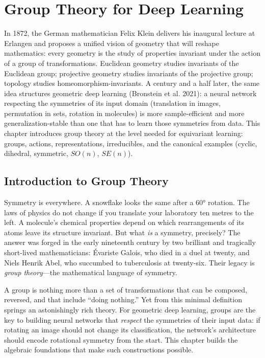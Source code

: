 \chapter{Group Theory for Deep Learning}
\label{ch:groups}

In 1872, the German mathematician Felix Klein delivers his inaugural lecture at Erlangen and proposes a unified vision of geometry that will reshape mathematics: every geometry is the study of properties invariant under the action of a group of transformations. Euclidean geometry studies invariants of the Euclidean group; projective geometry studies invariants of the projective group; topology studies homeomorphism-invariants. A century and a half later, the same idea structures geometric deep learning (Bronstein et al. 2021): a neural network respecting the symmetries of its input domain (translation in images, permutation in sets, rotation in molecules) is more sample-efficient and more generalization-stable than one that has to learn those symmetries from data. This chapter introduces group theory at the level needed for equivariant learning: groups, actions, representations, irreducibles, and the canonical examples (cyclic, dihedral, symmetric, $SO(n)$, $SE(n)$).

\section{Introduction to Group Theory}

Symmetry is everywhere. A snowflake looks the same after a $60°$ rotation. The laws of physics do not change if you translate your laboratory ten metres to the left. A molecule's chemical properties depend on which rearrangements of its atoms leave its structure invariant. But what \emph{is} a symmetry, precisely? The answer was forged in the early nineteenth century by two brilliant and tragically short-lived mathematicians: \'Evariste Galois, who died in a duel at twenty, and Niels Henrik Abel, who succumbed to tuberculosis at twenty-six. Their legacy is \emph{group theory}---the mathematical language of symmetry.

A group is nothing more than a set of transformations that can be composed, reversed, and that include ``doing nothing.'' Yet from this minimal definition springs an astonishingly rich theory. For geometric deep learning, groups are the key to building neural networks that \emph{respect} the symmetries of their input data: if rotating an image should not change its classification, the network's architecture should encode rotational symmetry from the start. This chapter builds the algebraic foundations that make such constructions possible.

